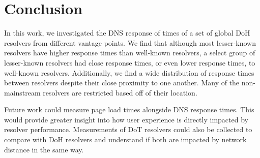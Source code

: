 \section{Conclusion}\label{sec:conclusion}

In this work, we investigated the DNS response of times of a set of global DoH
resolvers from different vantage points.  We find that although most
lesser-known resolvers have higher response times than well-known resolvers, a
select group of lesser-known resolvers had close response times, or even lower
response times, to well-known resolvers.  Additionally, we find a wide
distribution of response times between resolvers despite their close proximity
to one another.  Many of the non-mainstream resolvers are restricted based off
of their location.  

Future work could measure page load times alongside DNS response times.  This
would provide greater insight into how user experience is directly impacted by
resolver performance.  Measurements of DoT resolvers could also be collected
to compare with DoH resolvers and understand if both are impacted by network
distance in the same way. 
